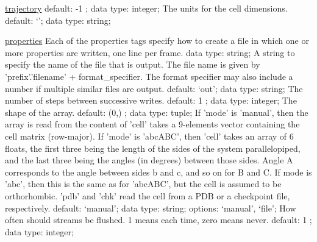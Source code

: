 \begin{ipifield}{}
\begin{ipifield}{\hyperref[TRAJECTORY]{trajectory}}
{{default:  -1 ; data type: integer; }%
%
{The units for the cell dimensions.}%
{default: `'; data type: string; }%
}
\end{ipifield}
\begin{ipifield}{\hyperref[PROPERTIES]{properties}}%
{Each of the properties tags specify how to create a file in which one or more properties are written, one line per frame. }%
{data type: string; }%
{%
{A string to specify the name of the file that is output. The file name is given by 'prefix'.'filename' + format\_specifier. The format specifier may also include a number if multiple similar files are output.}%
{default: `out'; data type: string; }%
%
{The number of steps between successive writes.}%
{default:  1 ; data type: integer; }%
%
{The shape of the array.}%
{default:  (0,) ; data type: tuple; }%
%
{If 'mode' is 'manual', then the array is read from the content of 'cell' takes a 9-elements vector containing the cell matrix (row-major). If 'mode' is 'abcABC', then 'cell' takes an array of 6 floats, the first three being the length of the sides of the system parallelopiped, and the last three being the angles (in degrees) between those sides. Angle A corresponds to the angle between sides b and c, and so on for B and C. If mode is 'abc', then this is the same as for 'abcABC', but the cell is assumed to be orthorhombic. 'pdb' and 'chk' read the cell from a PDB or a checkpoint file, respectively.}%
{default: `manual'; data type: string; options: `manual', `file'; }%
%
{How often should streams be flushed. 1 means each time, zero means never.}%
{default:  1 ; data type: integer; }%
}
\end{ipifield}
\end{ipifield}
